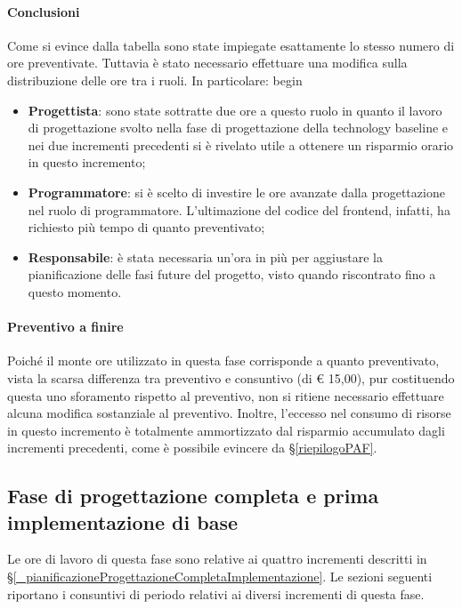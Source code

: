 \paragraph{Conclusioni}
Come si evince dalla tabella sono state impiegate esattamente lo stesso numero di ore preventivate. Tuttavia è stato necessario effettuare una modifica sulla distribuzione delle ore tra i ruoli. In particolare:
begin\begin{itemize}
	\item \textbf{Progettista}: sono state sottratte due ore a questo ruolo in quanto il lavoro di progettazione svolto nella fase di progettazione della technology baseline e nei due incrementi precedenti si è rivelato utile a ottenere un risparmio orario in questo incremento;
	\item \textbf{Programmatore}: si è scelto di investire le ore avanzate dalla progettazione nel ruolo di programmatore. L'ultimazione del codice del frontend, infatti, ha richiesto più tempo di quanto preventivato;
	\item \textbf{Responsabile}: è stata necessaria un'ora in più per aggiustare la pianificazione delle fasi future del progetto, visto quando riscontrato fino a questo momento.
\end{itemize} 

\paragraph{Preventivo a finire}
Poiché il monte ore utilizzato in questa fase corrisponde a quanto preventivato, vista la scarsa differenza tra preventivo e consuntivo (di € 15,00), pur costituendo questa uno sforamento rispetto al preventivo, non si ritiene necessario effettuare alcuna modifica sostanziale al preventivo. Inoltre, l'eccesso nel consumo di risorse in questo incremento è totalmente ammortizzato dal risparmio accumulato dagli incrementi precedenti, come è possibile evincere da \S\ref{riepilogoPAF}.

\subsection{Fase di progettazione completa e prima implementazione di base} \label{_consuntivoProgettazione}
Le ore di lavoro di questa fase sono relative ai quattro incrementi descritti in \S\ref{_pianificazioneProgettazioneCompletaImplementazione}.
Le sezioni seguenti riportano i consuntivi di periodo relativi ai diversi incrementi di questa fase.


